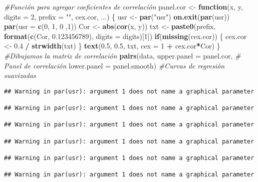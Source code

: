 \documentclass[
]{article}
\newenvironment{Shaded}{\begin{snugshade}}{\end{snugshade}}
\newcommand{\AttributeTok}[1]{\textcolor[rgb]{0.13,0.29,0.53}{#1}}
\newcommand{\CommentTok}[1]{\textcolor[rgb]{0.56,0.35,0.01}{\textit{#1}}}
\newcommand{\ControlFlowTok}[1]{\textcolor[rgb]{0.13,0.29,0.53}{\textbf{#1}}}
\newcommand{\DecValTok}[1]{\textcolor[rgb]{0.00,0.00,0.81}{#1}}
\newcommand{\FloatTok}[1]{\textcolor[rgb]{0.00,0.00,0.81}{#1}}
\newcommand{\FunctionTok}[1]{\textcolor[rgb]{0.13,0.29,0.53}{\textbf{#1}}}
\newcommand{\NormalTok}[1]{#1}
\newcommand{\OtherTok}[1]{\textcolor[rgb]{0.56,0.35,0.01}{#1}}
\newcommand{\SpecialCharTok}[1]{\textcolor[rgb]{0.81,0.36,0.00}{\textbf{#1}}}
\newcommand{\StringTok}[1]{\textcolor[rgb]{0.31,0.60,0.02}{#1}}
\begin{document}
\begin{Shaded}
\begin{Highlighting}[]
\CommentTok{\#Función para agregar coeficientes de correlación}
\NormalTok{panel.cor }\OtherTok{\textless{}{-}} \ControlFlowTok{function}\NormalTok{(x, y, }\AttributeTok{digits =} \DecValTok{2}\NormalTok{, }\AttributeTok{prefix =} \StringTok{""}\NormalTok{, cex.cor, ...) \{}
\NormalTok{  usr }\OtherTok{\textless{}{-}} \FunctionTok{par}\NormalTok{(}\StringTok{"usr"}\NormalTok{)}
  \FunctionTok{on.exit}\NormalTok{(}\FunctionTok{par}\NormalTok{(usr))}
  \FunctionTok{par}\NormalTok{(}\AttributeTok{usr =} \FunctionTok{c}\NormalTok{(}\DecValTok{0}\NormalTok{, }\DecValTok{1}\NormalTok{, }\DecValTok{0}\NormalTok{ ,}\DecValTok{1}\NormalTok{))}
\NormalTok{  Cor }\OtherTok{\textless{}{-}} \FunctionTok{abs}\NormalTok{(}\FunctionTok{cor}\NormalTok{(x, y)) }
\NormalTok{  txt }\OtherTok{\textless{}{-}} \FunctionTok{paste0}\NormalTok{(prefix, }\FunctionTok{format}\NormalTok{(}\FunctionTok{c}\NormalTok{(Cor, }\FloatTok{0.123456789}\NormalTok{), }\AttributeTok{digits =}\NormalTok{ digits)[}\DecValTok{1}\NormalTok{])}
  \ControlFlowTok{if}\NormalTok{(}\FunctionTok{missing}\NormalTok{(cex.cor)) \{}
\NormalTok{    cex.cor }\OtherTok{\textless{}{-}} \FloatTok{0.4} \SpecialCharTok{/} \FunctionTok{strwidth}\NormalTok{(txt)}
\NormalTok{  \}}
  \FunctionTok{text}\NormalTok{(}\FloatTok{0.5}\NormalTok{, }\FloatTok{0.5}\NormalTok{, txt,}
       \AttributeTok{cex =} \DecValTok{1} \SpecialCharTok{+}\NormalTok{ cex.cor}\SpecialCharTok{*}\NormalTok{Cor)}
\NormalTok{\}}
\CommentTok{\#Dibujamos la matriz de correlación}
\FunctionTok{pairs}\NormalTok{(data,}
      \AttributeTok{upper.panel =}\NormalTok{ panel.cor, }\CommentTok{\# Panel de correlación}
      \AttributeTok{lower.panel =}\NormalTok{ panel.smooth) }\CommentTok{\#Curvas de regresión suavizadas}
\end{Highlighting}
\end{Shaded}

\begin{verbatim}
## Warning in par(usr): argument 1 does not name a graphical parameter

## Warning in par(usr): argument 1 does not name a graphical parameter

## Warning in par(usr): argument 1 does not name a graphical parameter

## Warning in par(usr): argument 1 does not name a graphical parameter

## Warning in par(usr): argument 1 does not name a graphical parameter

## Warning in par(usr): argument 1 does not name a graphical parameter
\end{verbatim}
\end{document}
